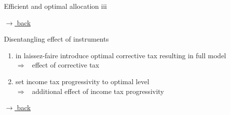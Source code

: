 \documentclass[11pt,aspectratio=169]{beamer}
\newcommand{\ar}{$\Rightarrow$ \ }
\begin{document}
\begin{frame}{Efficient and optimal allocation iii}
\begin{minipage}[]{0.3\textwidth}
	\end{minipage}
	
	\vspace{0mm}
	\hfill
	\hyperlink{effalloback}{\tiny{$\rightarrow$ back}} 
\end{frame}

%
\begin{frame}{{Disentangling effect of instruments}}
	\hypertarget{disen}{}
	\begin{enumerate}
				\item<+-> in laissez-faire introduce optimal corrective tax resulting in full model
		\\ \ar effect of corrective tax
		\vspace{3mm}
		\item<+-> set income tax progressivity to optimal level\\ \ar additional effect of income tax progressivity
	\end{enumerate}

	\vspace{20mm}
\hfill
\hyperlink{effalloback}{\tiny{$\rightarrow$ back}} 
\end{frame}
\end{document}

